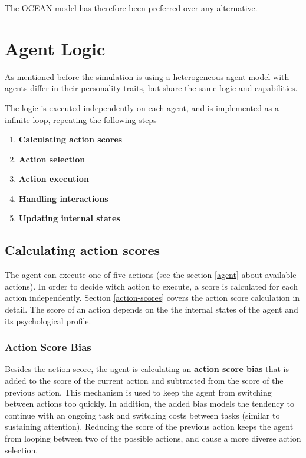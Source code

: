 \bb

The OCEAN model has therefore been preferred over any alternative.

\pagebreak

\section{Agent Logic}
As mentioned before the simulation is using a heterogeneous agent model with agents
differ in their personality traits, but share the same logic and capabilities.

The logic is executed independently on each agent, and is implemented as a infinite
loop, repeating the following steps

\begin{enumerate}
    \item \textbf{Calculating action scores}
    \item \textbf{Action selection}
    \item \textbf{Action execution}
    \item \textbf{Handling interactions}
    \item \textbf{Updating internal states}
\end{enumerate}

\subsection{Calculating action scores}
The agent can execute one of five actions (see the section \ref{agent} about available actions).
In order to decide witch action to execute, a score is calculated for each action independently.
Section \ref{action-scores} covers the action score calculation in detail. 
The score of an action depends on the the internal states of the agent and its
psychological profile.

\subsubsection{Action Score Bias}
Besides the action score, the agent is calculating an \textbf{action score bias}
that is added to the score of the current action and subtracted from the score
of the previous action. This mechanism is used to keep the agent from switching
between actions too quickly. In addition, the added bias models the tendency to
continue with an ongoing task and switching costs between tasks (similar to sustaining attention).
Reducing the score of the previous action keeps the agent from looping between two
of the possible actions, and cause a more diverse action selection.

